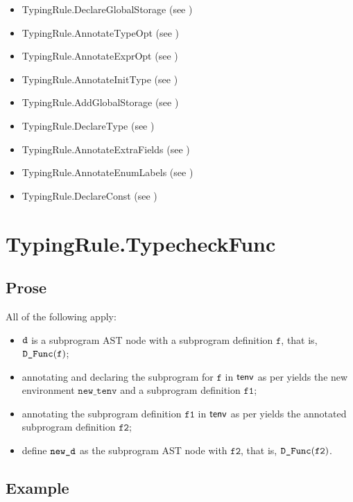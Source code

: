 \documentclass{book}
\newcommand\ProseOrTypeError[0]{\ProseTerminateAs{\TypeErrorConfig}}
\newcommand\newtenv[0]{\texttt{new\_tenv}}
\newcommand\vf[0]{\texttt{f}}
\newcommand\vfone[0]{\texttt{f1}}
\newcommand\vftwo[0]{\texttt{f2}}
\begin{document}
\begin{itemize}
  \item TypingRule.DeclareGlobalStorage (see )
  \item TypingRule.AnnotateTypeOpt (see )
  \item TypingRule.AnnotateExprOpt (see )
  \item TypingRule.AnnotateInitType (see )
  \item TypingRule.AddGlobalStorage (see )
  \item TypingRule.DeclareType (see )
  \item TypingRule.AnnotateExtraFields (see )
  \item TypingRule.AnnotateEnumLabels (see )
  \item TypingRule.DeclareConst (see )
\end{itemize}

\section{TypingRule.TypecheckFunc \label{sec:TypingRule.TypecheckFunc}}
\subsection{Prose}
All of the following apply:
\begin{itemize}
  \item $\texttt{d}$ is a subprogram AST node with a subprogram definition $\vf$, that is, $\DFunc(\vf)$;
  \item annotating and declaring the subprogram for $\vf$ in $\textsf{tenv}$ as per 
        yields the new environment $\newtenv$ and a subprogram definition $\vfone$\ProseOrTypeError;
  \item annotating the subprogram definition $\vfone$ in $\textsf{tenv}$ as per  yields
        the annotated subprogram definition $\vftwo$\ProseOrTypeError;
  \item define $\texttt{new\_d}$ as the subprogram AST node with $\vftwo$, that is, $\DFunc(\vftwo)$.
\end{itemize}

\subsection{Example}
\end{document}
